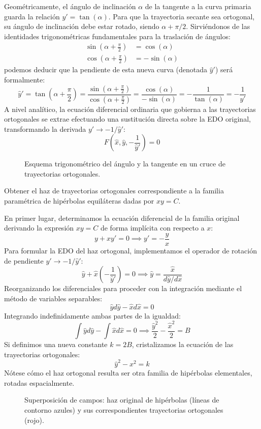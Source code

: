 Geométricamente, el ángulo de inclinación $\alpha$ de la tangente a la curva primaria guarda la relación $y' = \tan(\alpha)$. Para que la trayectoria secante sea ortogonal, su ángulo de inclinación debe estar rotado, siendo $\alpha + \pi/2$. Sirviéndonos de las identidades trigonométricas fundamentales para la traslación de ángulos:
\begin{align*}
    \sin\left(\alpha + \frac{\pi}{2}\right) &= \cos(\alpha) \\
    \cos\left(\alpha + \frac{\pi}{2}\right) &= -\sin(\alpha)
\end{align*}
podemos deducir que la pendiente de esta nueva curva (denotada $\hat{y}'$) será formalmente:
$$ \hat{y}' = \tan\left(\alpha + \frac{\pi}{2}\right) = \frac{\sin\left(\alpha + \frac{\pi}{2}\right)}{\cos\left(\alpha + \frac{\pi}{2}\right)} = \frac{\cos(\alpha)}{-\sin(\alpha)} = -\frac{1}{\tan(\alpha)} = -\frac{1}{y'} $$
A nivel analítico, la ecuación diferencial ordinaria que gobierna a las trayectorias ortogonales se extrae efectuando una sustitución directa sobre la EDO original, transformando la derivada $y' \to -1/\hat{y}'$:
$$ F\left(\hat{x}, \hat{y}, -\frac{1}{\hat{y}'}\right) = 0 $$

\begin{figure}[H]
    \centering
    
    \caption{Esquema trigonométrico del ángulo y la tangente en un cruce de trayectorias ortogonales.}
\end{figure}

\begin{ejercicio}
Obtener el haz de trayectorias ortogonales correspondiente a la familia paramétrica de hipérbolas equiláteras dadas por $xy = C$.
\end{ejercicio}

\begin{tcolorbox}
En primer lugar, determinamos la ecuación diferencial de la familia original derivando la expresión $xy=C$ de forma implícita con respecto a $x$:
$$ y + xy' = 0 \implies y' = -\frac{y}{x} $$
Para formular la EDO del haz ortogonal, implementamos el operador de rotación de pendiente $y' \to -1/\hat{y}'$:
$$ \hat{y} + \hat{x}\left(-\frac{1}{\hat{y}'}\right) = 0 \implies \hat{y} = \frac{\hat{x}}{d\hat{y}/d\hat{x}} $$
Reorganizando los diferenciales para proceder con la integración mediante el método de variables separables:
$$ \hat{y} d\hat{y} - \hat{x} d\hat{x} = 0 $$
Integrando indefinidamente ambas partes de la igualdad:
$$ \int \hat{y} d\hat{y} - \int \hat{x} d\hat{x} = 0 \implies \frac{\hat{y}^2}{2} - \frac{\hat{x}^2}{2} = B $$
Si definimos una nueva constante $k = 2B$, cristalizamos la ecuación de las trayectorias ortogonales:
$$ \hat{y}^2 - x^2 = k $$
Nótese cómo el haz ortogonal resulta ser otra familia de hipérbolas elementales, rotadas espacialmente.

\begin{figure}[H]
    \centering
    
    \caption{Superposición de campos: haz original de hipérbolas (líneas de contorno azules) y sus correspondientes trayectorias ortogonales (rojo).}
\end{figure}
\end{tcolorbox}


